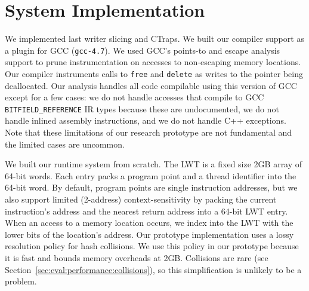 \documentclass[preprint,9pt]{sigplanconf}
\newcommand{\ctraps}{CTraps\xspace}
\begin{document}

\section{System Implementation}
\label{sec:implementation}
We implemented last writer slicing and \ctraps.  We built our compiler support
as a plugin for GCC ({\tt gcc-4.7}).  We used GCC's points-to and
escape analysis support to prune instrumentation on accesses to non-escaping memory
locations.  Our compiler instruments calls to {\tt free} and {\tt delete} as
writes to the pointer being deallocated.  Our analysis handles all code
compilable using this version of GCC except for a few cases: we do not handle
accesses that compile to GCC {\tt BITFIELD\_REFERENCE} IR types because these
are undocumented, we do not handle inlined assembly instructions, and we do not
handle C++ exceptions.  Note that these limitations of our research prototype
are not fundamental and the limited cases are uncommon.   

We built our runtime system from scratch.  The LWT is a fixed size 2GB array of
64-bit words.  Each entry packs a program point and a thread identifier into
the 64-bit word.  By default, program points are single instruction addresses,
but we also support limited (2-address) context-sensitivity by packing the
current instruction's address and the nearest return address into a 64-bit LWT
entry. When an access to a memory location occurs, we index into the LWT with
the lower bits of the location's address.  Our prototype implementation uses a
lossy resolution policy for hash collisions.  We use this policy in our
prototype because it is fast and bounds memory overheads at 2GB.  Collisions
are rare (see Section~\ref{sec:eval:performance:collisions}), so this
simplification is unlikely to be a problem.  
\end{document}
